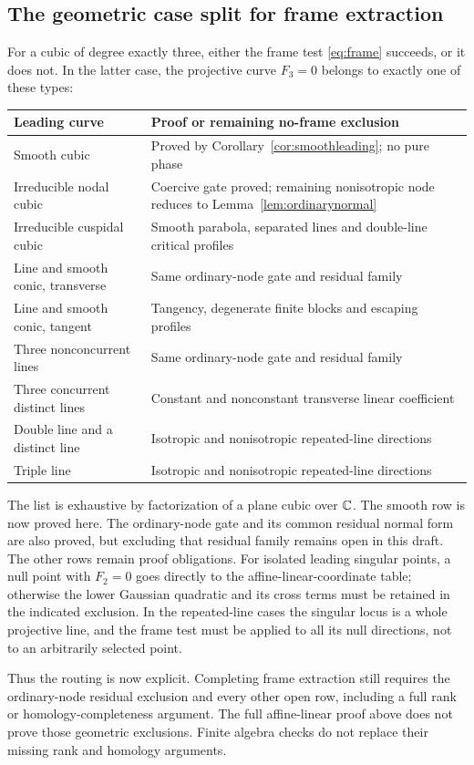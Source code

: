 \subsection{The geometric case split for frame extraction}

For a cubic of degree exactly three, either the frame test
\eqref{eq:frame} succeeds, or it does not. In the latter case,
the projective curve $F_3=0$ belongs to exactly one of these types:
\begin{center}\small
\begin{tabular}{@{}p{}p{}@{}}
\toprule
Leading curve & Proof or remaining no-frame exclusion\\
\midrule
Smooth cubic & Proved by Corollary~\ref{cor:smoothleading}; no pure phase\\
Irreducible nodal cubic & Coercive gate proved; remaining nonisotropic node reduces to Lemma~\ref{lem:ordinarynormal}\\
Irreducible cuspidal cubic & Smooth parabola, separated lines and double-line critical profiles\\
Line and smooth conic, transverse & Same ordinary-node gate and residual family\\
Line and smooth conic, tangent & Tangency, degenerate finite blocks and escaping profiles\\
Three nonconcurrent lines & Same ordinary-node gate and residual family\\
Three concurrent distinct lines & Constant and nonconstant transverse linear coefficient\\
Double line and a distinct line & Isotropic and nonisotropic repeated-line directions\\
Triple line & Isotropic and nonisotropic repeated-line directions\\
\bottomrule
\end{tabular}
\end{center}
The list is exhaustive by factorization of a plane cubic over $\mathbb C$.
The smooth row is now proved here. The ordinary-node gate and its
common residual normal form are also proved, but excluding that
residual family remains open in this draft. The other rows remain
proof obligations. For isolated leading singular points, a null
point with $F_2=0$ goes directly to the affine-linear-coordinate table;
otherwise the lower Gaussian quadratic and its cross terms must be
retained in the indicated exclusion. In the repeated-line cases the
singular locus is a whole projective line, and the frame test must be
applied to all its null directions, not to an arbitrarily selected point.

Thus the routing is now explicit. Completing frame extraction still
requires the ordinary-node residual exclusion and every other open
row, including a full rank or homology-completeness argument. The full affine-linear proof above does not prove those geometric
exclusions. Finite algebra checks do not replace their missing
rank and homology arguments.
